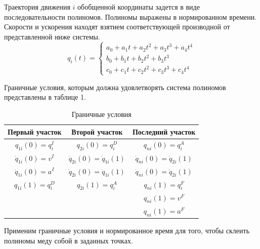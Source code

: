\documentclass[a4paper,14pt]{extreport}
\begin{document}
	Траектория движения $i$ обобщенной координаты задется в виде последовательности полиномов. Полиномы выражены в нормированном времени. Скорости и ускорения находят взятием соответствующей производной от представленной ниже системы.
	\begin{equation*}
	q_i(t) = 
	\begin{cases}
		a_0 + a_1  t + a_2  t^2 + a_3 t^3 + a_4 t^4 \\
		b_0 + b_1  t + b_2  t^2 + b_3 t^3  \\
		c_0 + c_1  t + c_2  t^2 + c_3 t^3 + c_4 t^4
	\end{cases}
	\end{equation*}
	 
	 Граничные условия, которым должна удовлетворять система полиномов представлены в таблице 1. 
		\begin{table}[H]
		\caption{\label{tab:canonsummary}Граничные условия}
		\begin{center}
			\begin{tabular}{|c|c|c|}
				\hline
				Первый участок & Второй участок & Последний участок \\
				\hline
				$q_{1i}(0)= q^I_i$ 		& $q_{2i}(0)= q^D_i$					& $q_{ni}(0)= q^A_i$\\
				$\dot q_{1i}(0) = v^I$	& $\dot q_{2i}(0) = \dot q_{1i}(1)$ 	& $\dot q_{ni}(0) = \dot q_{2i}(1)$\\
				$\ddot q_{1i}(0) = a^I$	& $\ddot q_{2i}(0) = \ddot q_{1i}(1)$	& $\ddot q_{ni}(0) = \ddot q_{2i}(1)$\\
				$q_{1i}(1) = q^D_i$		& $q_{2i}(1) = q^A_i$				&$q_{ni}(1) = q^F_i$\\
				&& $q_{ni}(1) = v^F$\\
				&& $q_{ni}(1) = a^F$\\
				\hline
			\end{tabular}
		\end{center}
	\end{table} 
	
	Применим граничные условия и нормированное время для того, чтобы склеить полиномы меду собой в заданных точках.
	
\end{document}
